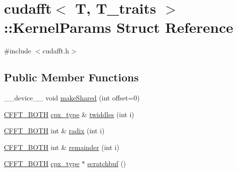 \hypertarget{structcudafft_1_1_kernel_params}{}\section{cudafft$<$ T, T\+\_\+traits $>$\+:\+:Kernel\+Params Struct Reference}
\label{structcudafft_1_1_kernel_params}


{\ttfamily \#include $<$cudafft.\+h$>$}

\subsection*{Public Member Functions}
\begin{DoxyCompactItemize}
\item 
\+\_\+\+\_\+device\+\_\+\+\_\+ void \hyperlink{structcudafft_1_1_kernel_params_ad0be6596aeac3ac8bbdd24da474ba36c}{make\+Shared} (int offset=0)
\item 
\hyperlink{cudafft_8h_ac4c6e1a008a73d82e1c532fd74830837}{C\+F\+F\+T\+\_\+\+B\+O\+TH} \hyperlink{classcudafft_a6b6e4901630f197baf4cf7f165543ece}{cpx\+\_\+type} \& \hyperlink{structcudafft_1_1_kernel_params_a22d047345d9de9a83b010ba5fd35d17b}{twiddles} (int i)
\item 
\hyperlink{cudafft_8h_ac4c6e1a008a73d82e1c532fd74830837}{C\+F\+F\+T\+\_\+\+B\+O\+TH} int \& \hyperlink{structcudafft_1_1_kernel_params_acebcf4450afbdb00652fad09399a837f}{radix} (int i)
\item 
\hyperlink{cudafft_8h_ac4c6e1a008a73d82e1c532fd74830837}{C\+F\+F\+T\+\_\+\+B\+O\+TH} int \& \hyperlink{structcudafft_1_1_kernel_params_a26d79a55493598108efa7c93b085f5d1}{remainder} (int i)
\item 
\hyperlink{cudafft_8h_ac4c6e1a008a73d82e1c532fd74830837}{C\+F\+F\+T\+\_\+\+B\+O\+TH} \hyperlink{classcudafft_a6b6e4901630f197baf4cf7f165543ece}{cpx\+\_\+type} $\ast$ \hyperlink{structcudafft_1_1_kernel_params_a61f05eeade72281b0dc51b61d35025ea}{scratchbuf} ()
\end{DoxyCompactItemize}

